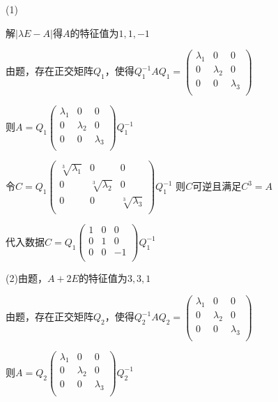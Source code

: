 \documentclass[lang=cn,10pt]{elegantbook}
\begin{document}
\begin{solution}
	
	(1)
	
	解$|\lambda E-A|$得$A$的特征值为$1,1,-1$
	
	由题，存在正交矩阵$Q_{1}$，使得$Q_{1}^{-1}AQ_{1}=\left( \begin{matrix}
		\lambda _1&		0&		0\\
		0&		\lambda _2&		0\\
		0&		0&		\lambda _3\\
	\end{matrix} \right)$
	
	则$A=Q_{1}\left( \begin{matrix}
		\lambda _1&		0&		0\\
		0&		\lambda _2&		0\\
		0&		0&		\lambda _3\\
	\end{matrix} \right)Q_{1}^{-1}$
	
	令$C=Q_{1}\left( \begin{matrix}
		\sqrt[3]{\lambda _1}&		0&		0\\
		0&		\sqrt[3]{\lambda _2}&		0\\
		0&		0&		\sqrt[3]{\lambda _3}\\
	\end{matrix} \right)Q_{1}^{-1}$ 
	则$C$可逆且满足$C^{3}=A$
	
	代入数据$C=Q_{1}\left( \begin{matrix}
		1&		0&		0\\
		0&		1&		0\\
		0&		0&		-1\\
	\end{matrix} \right)Q_{1}^{-1}$
	
	(2)由题，$A+2E$的特征值为$3,3,1$
	
	由题，存在正交矩阵$Q_{2}$，使得$Q_{2}^{-1}AQ_{2}=\left( \begin{matrix}
		\lambda _1&		0&		0\\
		0&		\lambda _2&		0\\
		0&		0&		\lambda _3\\
	\end{matrix} \right)$
	
	则$A=Q_{2}\left( \begin{matrix}
		\lambda _1&		0&		0\\
		0&		\lambda _2&		0\\
		0&		0&		\lambda _3\\
	\end{matrix} \right)Q_{2}^{-1}$
	

\end{solution}
\end{document}
